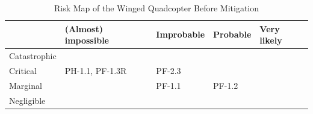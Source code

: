\begin{table}[H]
    \centering
    \caption{Risk Map of the Winged Quadcopter Before Mitigation}
    \label{tab:risk_map_wing_quad}
    \begin{tabular}{  p{2.2cm}  p{3.2cm}    p{2.95cm}   p{2.8cm}    p{2.4cm}    }
    \toprule
                    & (Almost) impossible                                       & Improbable                                    & Probable                          & Very likely
    \\ \midrule
    Catastrophic    &\cellcolor[HTML]{d9ead3}                                   &\cellcolor[HTML]{fff2cc}                       &\cellcolor[HTML]{f4cccc}           &\cellcolor[HTML]{f4cccc}
    \\ \hdashline
    Critical        &\cellcolor[HTML]{d9ead3} PH-1.1, PF-1.3R    &\cellcolor[HTML]{fff2cc} PF-2.3 &\cellcolor[HTML]{fff2cc}           &\cellcolor[HTML]{f4cccc}
    \\ \hdashline
    Marginal        &\cellcolor[HTML]{d9ead3}                      &\cellcolor[HTML]{d9ead3}  PF-1.1                &\cellcolor[HTML]{fff2cc} PF-1.2    &\cellcolor[HTML]{fff2cc}
    \\ \hdashline
    Negligible      &\cellcolor[HTML]{d9ead3}                                   &\cellcolor[HTML]{d9ead3}                       &\cellcolor[HTML]{d9ead3}           &\cellcolor[HTML]{d9ead3}
    \\ \bottomrule
    \end{tabular}
\end{table}





